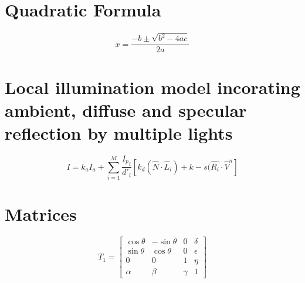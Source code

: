 \documentclass[a4paper]{article}
\begin{document}
\section{Quadratic Formula}
\[x=\frac{-b\pm \sqrt{b^2-4ac}}{2a} \]

\section{Local illumination model incorating ambient, diffuse and specular reflection by multiple lights }
\[ I= k_a I_a + \sum_{i=1}^M { \frac{{I_p}_i}{d'_i}}
[ k_d(\hat{N} \cdot \hat{L_i}) + k-s(\hat{R_i} \cdot \hat{V}^n] \]

\section{Matrices}
   \[ T_1 = \left[
    \begin{array}{cccc}
    \cos \theta & -\sin \theta & 0 & \delta \\
    \sin \theta  & \cos \theta & 0 & \epsilon \\
    0 & 0 & 1 & \eta \\
    \alpha & \beta & \gamma & 1
    \end{array}
    \right] \]
\end{document}
